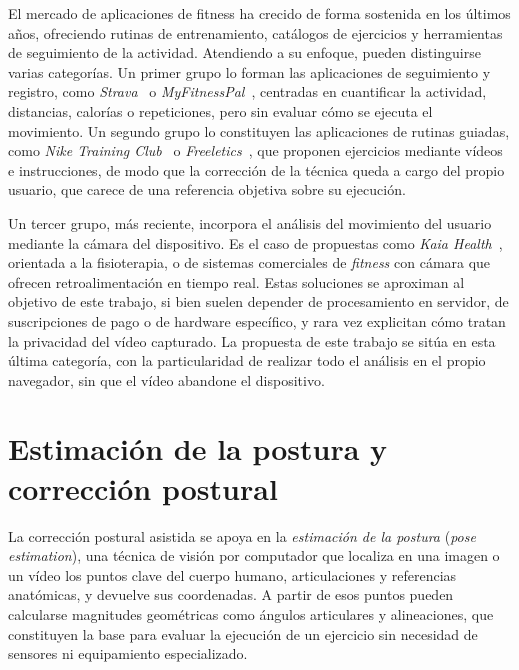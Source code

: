 \documentclass[12pt,a4paper,twoside,openright]{book}
\begin{document}
    El mercado de aplicaciones de fitness ha crecido de forma sostenida en los
    últimos años, ofreciendo rutinas de entrenamiento, catálogos de ejercicios y
    herramientas de seguimiento de la actividad. Atendiendo a su enfoque, pueden
    distinguirse varias categorías. Un primer grupo lo forman las aplicaciones de
    seguimiento y registro, como \textit{Strava}~\cite{strava} o \textit{MyFitnessPal}~\cite{myfitnesspal},
    centradas en cuantificar la actividad, distancias, calorías o
    repeticiones, pero sin evaluar cómo se ejecuta el movimiento. Un segundo
    grupo lo constituyen las aplicaciones de rutinas guiadas, como
    \textit{Nike Training Club}~\cite{niketraining} o \textit{Freeletics}~\cite{freeletics},
    que proponen ejercicios mediante vídeos e instrucciones, de modo que la
    corrección de la técnica queda a cargo del propio usuario, que carece de
    una referencia objetiva sobre su ejecución.

    Un tercer grupo, más reciente, incorpora el análisis del movimiento del
    usuario mediante la cámara del dispositivo. Es el caso de propuestas como
    \textit{Kaia Health}~\cite{kaia}, orientada a la fisioterapia, o de sistemas comerciales
    de \textit{fitness} con cámara que ofrecen retroalimentación en tiempo real.
    Estas soluciones se aproximan al objetivo de este trabajo, si bien suelen
    depender de procesamiento en servidor, de suscripciones de pago o de
    hardware específico, y rara vez explicitan cómo tratan la privacidad del
    vídeo capturado. La propuesta de este trabajo se sitúa en esta última
    categoría, con la particularidad de realizar todo el análisis en el propio
    navegador, sin que el vídeo abandone el dispositivo.

    \section{Estimación de la postura y corrección postural}

    La corrección postural asistida se apoya en la \textit{estimación de la postura}
    (\textit{pose estimation}), una técnica de visión por computador que localiza
    en una imagen o un vídeo los puntos clave del cuerpo humano, articulaciones
    y referencias anatómicas, y devuelve sus coordenadas. A partir de esos
    puntos pueden calcularse magnitudes geométricas como ángulos articulares y
    alineaciones, que constituyen la base para evaluar la ejecución de un
    ejercicio sin necesidad de sensores ni equipamiento especializado.
\end{document}
